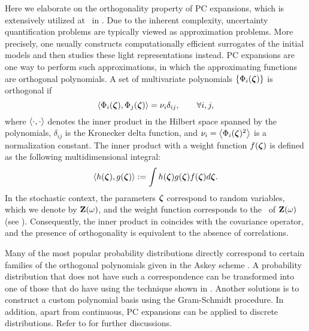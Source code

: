 Here we elaborate on the orthogonality property \cite{xiu2010, maitre2010} of PC expansions, which is extensively utilized at \ in .
Due to the inherent complexity, uncertainty quantification problems are typically viewed as approximation problems.
More precisely, one usually constructs computationally efficient surrogates of the initial models and then studies these light representations instead.
PC expansions \cite{xiu2010} are one way to perform such approximations, in which the approximating functions are orthogonal polynomials.
A set of multivariate polynomials $\{ \Phi_i(\boldsymbol{\zeta}) \}$ is orthogonal if
\begin{equation} \elabel{orthogonality}
  \oInner{\pcb_i(\vz)}{\pcb_j(\vz)} = \pcn_i \delta_{ij}, \qquad \forall i, j,
\end{equation}
where $\oInner{\cdot}{\cdot}$ denotes the inner product in the Hilbert space spanned by the polynomials, $\delta_{ij}$ is the Kronecker delta function, and $\pcn_i = \oInner{\pcb_i(\vz)^2}$ is a normalization constant.
The inner product with a weight function $f(\boldsymbol{\zeta})$ is defined as the following multidimensional integral:
\begin{equation} \elabel{inner-product}
  \oInner{h(\vz)}{g(\vz)} := \int h(\vz) g(\vz) \fPDF(\vz) d\vz.
\end{equation}
In the stochastic context, the parameters $\boldsymbol{\zeta}$ correspond to random variables, which we denote by $\mathbf{Z}(\omega)$, and the weight function corresponds to the \pdf\ of $\mathbf{Z}(\omega)$ (see ).
Consequently, the inner product in  coincides with the covariance operator, and the presence of orthogonality is equivalent to the absence of correlations.

Many of the most popular probability distributions directly correspond to certain families of the orthogonal polynomials given in the Askey scheme \cite{xiu2010}.
A probability distribution that does not have such a correspondence can be transformed into one of those that do have using the technique shown in .
Another solutions is to construct a custom polynomial basis using the Gram-Schmidt procedure.
In addition, apart from continuous, PC expansions can be applied to discrete distributions.
Refer to \cite{xiu2010, maitre2010} for further discussions.
